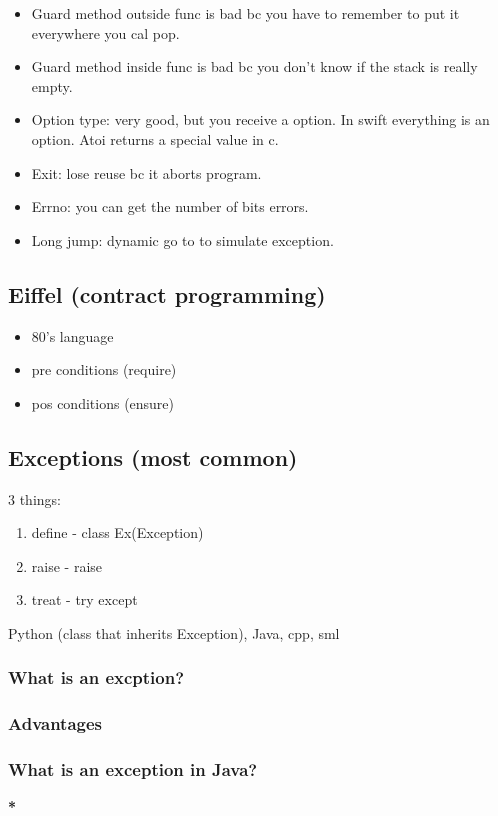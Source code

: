 \documentclass[11pt]{article}
\begin{document}
\begin{itemize}
\item Guard method outside func is bad bc you have to remember to put it everywhere you cal pop.
\item Guard method inside func is bad bc you don't know if the stack is really empty.
\item Option type: very good, but you receive a option. In swift everything is an
option. Atoi returns a special value in c.
\item Exit: lose reuse bc it aborts program.
\item Errno: you can get the number of bits errors.
\item Long jump: dynamic go to to simulate exception.
\end{itemize}
\subsection{Eiffel (contract programming)}
\label{sec:orgcd5a87e}
\begin{itemize}
\item 80's language
\item pre conditions (require)
\item pos conditions (ensure)
\end{itemize}



\subsection{Exceptions (most common)}
\label{sec:org41ac06d}
3 things:
\begin{enumerate}
\item define - class Ex(Exception)
\item raise - raise
\item treat - try except
\end{enumerate}

Python (class that inherits Exception), Java, cpp, sml
\subsubsection{What is an excption?}
\label{sec:org033c50c}
\subsubsection{Advantages}
\label{sec:org8dc1a60}
\subsubsection{What is an exception in Java?}
\label{sec:org3505889}
\textbf{*}
\end{document}
